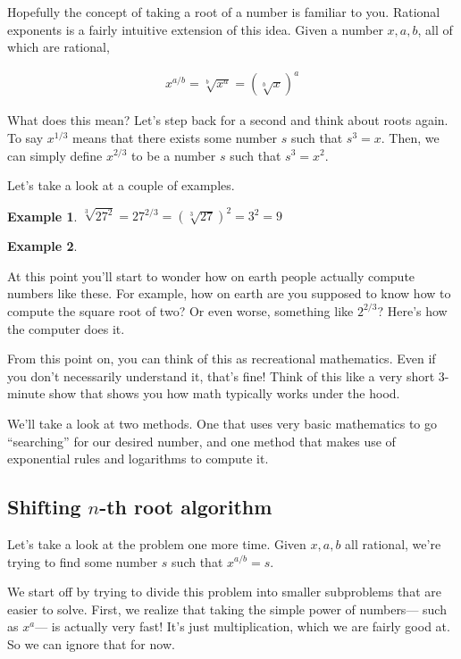\documentclass{scrbook}
\theoremstyle{definition}
\newtheorem{example}{Example}
\begin{document}
Hopefully the concept of taking a root of a number is familiar to you. Rational exponents is a fairly intuitive extension of this idea. Given a number $x, a, b$, all of which are rational, 

\begin{align*}
  x^{a/b} = \sqrt[b]{x^a} = (\sqrt[b]{x})^a
\end{align*}

What does this mean? Let's step back for a second and think about roots again. To say $x^{1/3}$ means that there exists some number $s$ such that $s^3 = x$. Then, we can simply define $x^{2/3}$ to be a number $s$ such that $s^3 = x^2$. 

Let's take a look at a couple of examples.

\begin{example}
  $\sqrt[3]{27^2} = 27^{2/3} = (\sqrt[3]{27})^2 = 3^2 = 9$
\end{example}

\begin{example}
  
\end{example}

At this point you'll start to wonder how on earth people actually compute numbers like these. For example, how on earth are you supposed to know how to compute the square root of two? Or even worse, something like $2^{2/3}$? Here's how the computer does it.

From this point on, you can think of this as recreational mathematics. Even if you don't necessarily understand it, that's fine! Think of this like a very short 3-minute show that shows you how math typically works under the hood. 

We'll take a look at two methods. One that uses very basic mathematics to go ``searching'' for our desired number, and one method that makes use of exponential rules and logarithms to compute it. 

\subsection{Shifting $n$-th root algorithm}

Let's take a look at the problem one more time. Given $x, a, b$ all rational, we're trying to find some number $s$ such that $x^{a/b} = s$. 

We start off by trying to divide this problem into smaller subproblems that are easier to solve. First, we realize that taking the simple power of numbers--- such as $x^a$--- is actually very fast! It's just multiplication, which we are fairly good at. So we can ignore that for now.
\end{document}
